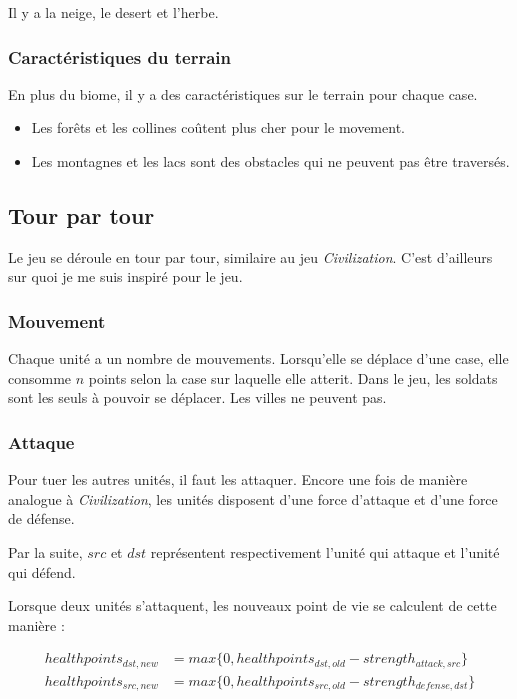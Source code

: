 \documentclass{article}
\begin{document}
Il y a la neige, le desert et l'herbe.

\subsubsection{Caractéristiques du terrain}
En plus du biome, il y a des caractéristiques sur le terrain pour chaque case.

\begin{itemize}
    \item Les forêts et les collines coûtent plus cher pour le movement.
    \item Les montagnes et les lacs sont des obstacles qui ne peuvent pas être traversés.
\end{itemize}

\subsection{Tour par tour}
Le jeu se déroule en tour par tour, similaire au jeu \textit{Civilization}. C'est d'ailleurs
sur quoi je me suis inspiré pour le jeu.

\subsubsection{Mouvement}

Chaque unité a un nombre de mouvements. Lorsqu'elle se déplace d'une case, elle consomme $n$ points selon la case sur laquelle elle atterit.
Dans le jeu, les soldats sont les seuls à pouvoir se déplacer. Les villes ne peuvent pas.

\subsubsection{Attaque}
Pour tuer les autres unités, il faut les attaquer. Encore une fois de manière analogue à \textit{Civilization},
les unités disposent d'une force d'attaque et d'une force de défense.

Par la suite, $src$ et $dst$ représentent respectivement l'unité qui attaque et l'unité
qui défend.

Lorsque deux unités s'attaquent, les nouveaux point de vie se calculent de cette manière : 

\begin{align}
    healthpoints_{dst,new} &= max \{0,healthpoints_{dst,old} - strength_{attack,src}\} \\
    healthpoints_{src,new} &= max \{0,healthpoints_{src,old} - strength_{defense,dst}\}
\end{align}
\end{document}
